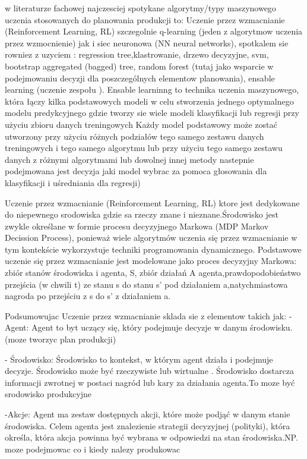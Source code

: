 w literaturze fachowej najczesciej spotykane algorytmy/typy maszynowego uczenia stosowanych do planowania produkcji to: Uczenie przez wzmacnianie (Reinforcement Learning, RL) szczegolnie q-learning (jeden z algorytmow uczenia przez wzmocnienie) jak i  siec neuronowa (NN neural networks), spotkalem sie rowniez z uzyciem : regression tree,klastrowanie, drzewo decyzyjne, svm, bootstrap aggregated (bagged) tree, random forest (tutaj jako wsparcie w podejmowaniu decyzji dla poszczególnych elementow planowania), ensable learning (uczenie zespołu ). Ensable learninng  to technika uczenia maszynowego, która łączy kilka podstawowych modeli w celu stworzenia jednego optymalnego modelu predykcyjnego gdzie tworzy sie wiele modeli klasyfikacji lub regresji przy użyciu zbioru danych treningowych Każdy model podstawowy może zostać utworzony przy użyciu różnych podziałów tego samego zestawu danych treningowych i tego samego algorytmu lub przy użyciu tego samego zestawu danych z różnymi algorytmami lub dowolnej innej metody nastepnie podejmowana jest decyzja jaki model wybrac za pomoca głosowania dla klasyfikacji i uśredniania  dla regresji)



Uczenie przez wzmacnianie (Reinforcement Learning, RL) ktore jest dedykowane do niepewnego srodowiska gdzie sa rzeczy znane i nieznane.Środowisko jest zwykle określane w formie procesu decyzyjnego Markowa (MDP Markov Decission Process), ponieważ wiele algorytmów uczenia się przez wzmacnianie w tym kontekście wykorzystuje techniki programowania dynamicznego.
Podstawowe uczenie się przez wzmacnianie jest modelowane jako proces decyzyjny Markowa:
   zbiór stanów środowiska i agenta, S, zbiór działań A agenta,prawdopodobieństwo przejścia (w chwili  t) ze stanu s  do stanu  s' pod działaniem  a,natychmiastowa nagroda po przejściu z s do  s' z działaniem  a.
 

Podsumowujac Uczenie przez wzmacnianie sklada sie z elementow takich jak:
- Agent: Agent to byt uczący się, który podejmuje decyzje w danym środowisku. (moze tworzyc plan produkcji)

- Środowisko: Środowisko to kontekst, w którym agent działa i podejmuje decyzje. Środowisko może być rzeczywiste  lub wirtualne . Środowisko dostarcza informacji zwrotnej w postaci nagród lub kary za działania agenta.To moze być srodowisko produkcyjne

-Akcje: Agent ma zestaw dostępnych akcji, które może podjąć w danym stanie środowiska. Celem agenta jest znalezienie strategii decyzyjnej (polityki), która określa, która akcja powinna być wybrana w odpowiedzi na stan środowiska.NP. moze podejmowac co i kiedy nalezy produkowac

